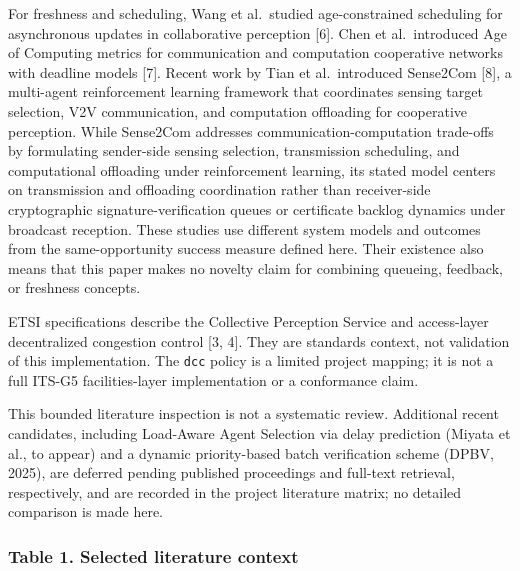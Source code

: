 \documentclass[
]{article}
\begin{document}
For freshness and scheduling, Wang et al.~studied age-constrained
scheduling for asynchronous updates in collaborative perception {[}6{]}.
Chen et al.~introduced Age of Computing metrics for communication and
computation cooperative networks with deadline models {[}7{]}. Recent
work by Tian et al.~introduced Sense2Com {[}8{]}, a multi-agent
reinforcement learning framework that coordinates sensing target
selection, V2V communication, and computation offloading for cooperative
perception. While Sense2Com addresses communication-computation
trade-offs by formulating sender-side sensing selection, transmission
scheduling, and computational offloading under reinforcement learning,
its stated model centers on transmission and offloading coordination
rather than receiver-side cryptographic signature-verification queues or
certificate backlog dynamics under broadcast reception. These studies
use different system models and outcomes from the same-opportunity
success measure defined here. Their existence also means that this paper
makes no novelty claim for combining queueing, feedback, or freshness
concepts.

ETSI specifications describe the Collective Perception Service and
access-layer decentralized congestion control {[}3, 4{]}. They are
standards context, not validation of this implementation. The
\texttt{dcc} policy is a limited project mapping; it is not a full
ITS-G5 facilities-layer implementation or a conformance claim.

This bounded literature inspection is not a systematic review.
Additional recent candidates, including Load-Aware Agent Selection via
delay prediction (Miyata et al., to appear) and a dynamic priority-based
batch verification scheme (DPBV, 2025), are deferred pending published
proceedings and full-text retrieval, respectively, and are recorded in
the project literature matrix; no detailed comparison is made here.

\subsubsection{Table 1. Selected literature
context}\label{table-1.-selected-literature-context}
\end{document}
